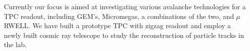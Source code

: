 Currently our focus is aimed at investigating various avalanche technologies for a TPC readout, including GEM’s, Micromegas, a combinations of the two, and $\mu$RWELL. We have built a prototype TPC with zigzag readout and employ a newly built cosmic ray telescope to study the reconstruction of particle tracks in the lab. 


